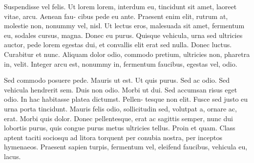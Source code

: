 \documentclass[ngerman,titlepage]{uzhpub}
\begin{document}
Suspendisse vel felis. Ut lorem lorem, interdum eu, tincidunt sit
amet, laoreet vitae, arcu. Aenean fau- cibus pede eu ante. Praesent
enim elit, rutrum at, molestie non, nonummy vel, nisl. Ut lectus eros,
malesuada sit amet, fermentum eu, sodales cursus, magna. Donec eu
purus. Quisque vehicula, urna sed ultricies auctor, pede lorem egestas
dui, et convallis elit erat sed nulla. Donec luctus. Curabitur et
nunc. Aliquam dolor odio, commodo pretium, ultricies non, pharetra
in, velit. Integer arcu est, nonummy in, fermentum faucibus, egestas
vel, odio. 

Sed commodo posuere pede. Mauris ut est. Ut quis purus. Sed ac odio.
Sed vehicula hendrerit sem. Duis non odio. Morbi ut dui. Sed accumsan
risus eget odio. In hac habitasse platea dictumst. Pellen- tesque
non elit. Fusce sed justo eu urna porta tincidunt. Mauris felis odio,
sollicitudin sed, volutpat a, ornare ac, erat. Morbi quis dolor. Donec
pellentesque, erat ac sagittis semper, nunc dui lobortis purus, quis
congue purus metus ultricies tellus. Proin et quam. Class aptent taciti
sociosqu ad litora torquent per conubia nostra, per inceptos hymenaeos.
Praesent sapien turpis, fermentum vel, eleifend faucibus, vehicula
eu, lacus. 
\end{document}
